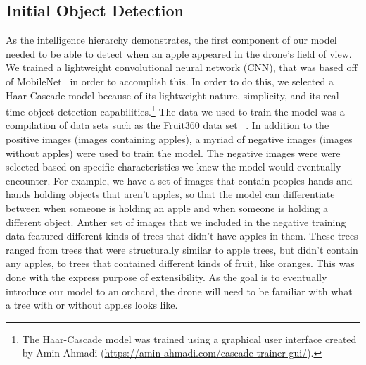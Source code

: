 \subsection{Initial Object Detection}
As the intelligence hierarchy demonstrates, the first component of our model needed to be able to detect when an apple appeared in the drone's field of view. 
We trained a lightweight convolutional neural network (CNN), that was based off of MobileNet~\cite{Sandler2018,PyTorchMobileNet} in order to accomplish this. 
In order to do this, we selected a Haar-Cascade model because of its lightweight nature, simplicity, and its real-time object detection capabilities.\footnote{The Haar-Cascade model was trained using a graphical user interface created by Amin Ahmadi (\url{https://amin-ahmadi.com/cascade-trainer-gui/}).} 
The data we used to train the model was a compilation of data sets such as the Fruit360 data set ~\cite{Fruit360}.
In addition to the positive images (images containing apples), a myriad of negative images (images without apples) were used to train the model.
The negative images were were selected based on specific characteristics we knew the model would eventually encounter. 
For example, we have a set of images that contain peoples hands and hands holding objects that aren't apples, so that the model can differentiate between when someone is holding an apple and when someone is holding a different object.
Anther set of images that we included in the negative training data featured different kinds of trees that didn't have apples in them.
These trees ranged from trees that were structurally similar to apple trees, but didn't contain any apples, to trees that contained different kinds of fruit, like oranges.
This was done with the express purpose of extensibility.
As the goal is to eventually introduce our model to an orchard, the drone will need to be familiar with what a tree with or without apples looks like.
